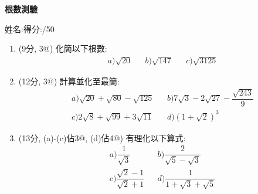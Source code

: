 \documentclass[12pt]{article}
\begin{document}
    \begin{center}
        \textbf{根數測驗}
    \end{center}
    姓名:\hrulefill \hfill 得分:\hrulefill/50
    \begin{enumerate}
        \item (9分, 3@) 化簡以下根數:\begin{align*}
            &a) \sqrt{20} && b) \sqrt{147} && c) \sqrt{3125}
        \end{align*}

        \hrulefill

        \hrulefill

        \hrulefill

        \hrulefill

        \hrulefill

        \hrulefill
        \item (12分, 3@) 計算並化至最簡: \begin{align*}
            &a) \sqrt{20}+\sqrt{80}-\sqrt{125} && b) 7\sqrt{3}-2\sqrt{27}-\dfrac{\sqrt{243}}{9}\\
            &c) 2\sqrt{8}+\sqrt{99}+3\sqrt{11} && d) (1+\sqrt{2})^3
        \end{align*}

        \hrulefill

        \hrulefill

        \hrulefill

        \hrulefill

        \hrulefill

        \hrulefill

        \hrulefill

        \hrulefill

        \hrulefill

        \hrulefill

        \hrulefill

        \hrulefill
        \item (13分, (a)-(c)佔3@, (d)佔4@) 有理化以下算式: \begin{align*}
            &a) \dfrac{1}{\sqrt{3}} && b) \dfrac{2}{\sqrt{5}-\sqrt{3}}\\
            &c) \dfrac{\sqrt{2}-1}{\sqrt{2}+1} && d) \dfrac{1}{1+\sqrt{3}+\sqrt{5}}
        \end{align*}

        \hrulefill

        \hrulefill

        \hrulefill


\end{enumerate}
\end{document}

